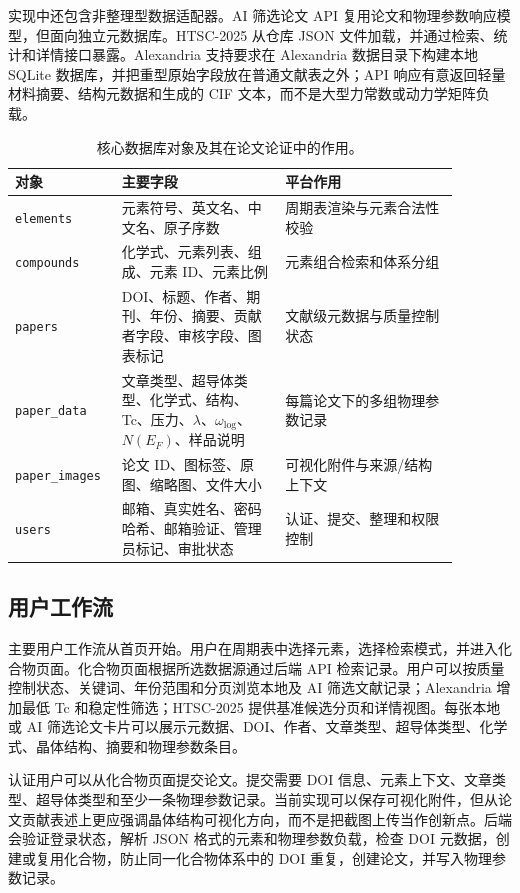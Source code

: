 \documentclass[11pt,a4paper]{ctexart}
\begin{document}
实现中还包含非整理型数据适配器。AI 筛选论文 API 复用论文和物理参数响应模型，但面向独立元数据库。HTSC-2025 从仓库 JSON 文件加载，并通过检索、统计和详情接口暴露。Alexandria 支持要求在 Alexandria 数据目录下构建本地 SQLite 数据库，并把重型原始字段放在普通文献表之外；API 响应有意返回轻量材料摘要、结构元数据和生成的 CIF 文本，而不是大型力常数或动力学矩阵负载。

\begin{table}[t]
\centering
\caption{核心数据库对象及其在论文论证中的作用。}
\label{tab:model-zh}
\begin{tabular}{>{\raggedright\arraybackslash}p{0.18\linewidth} >{\raggedright\arraybackslash}p{0.34\linewidth} >{\raggedright\arraybackslash}p{0.36\linewidth}}
\toprule
对象 & 主要字段 & 平台作用 \\
\midrule
\texttt{elements} & 元素符号、英文名、中文名、原子序数 & 周期表渲染与元素合法性校验 \\
\texttt{compounds} & 化学式、元素列表、组成、元素 ID、元素比例 & 元素组合检索和体系分组 \\
\texttt{papers} & DOI、标题、作者、期刊、年份、摘要、贡献者字段、审核字段、图表标记 & 文献级元数据与质量控制状态 \\
\texttt{paper\_data} & 文章类型、超导体类型、化学式、结构、Tc、压力、$\lambda$、$\omega_{\log}$、$N(E_F)$、样品说明 & 每篇论文下的多组物理参数记录 \\
\texttt{paper\_images} & 论文 ID、图标签、原图、缩略图、文件大小 & 可视化附件与来源/结构上下文 \\
\texttt{users} & 邮箱、真实姓名、密码哈希、邮箱验证、管理员标记、审批状态 & 认证、提交、整理和权限控制 \\
\bottomrule
\end{tabular}
\end{table}

\subsection{用户工作流}

主要用户工作流从首页开始。用户在周期表中选择元素，选择检索模式，并进入化合物页面。化合物页面根据所选数据源通过后端 API 检索记录。用户可以按质量控制状态、关键词、年份范围和分页浏览本地及 AI 筛选文献记录；Alexandria 增加最低 Tc 和稳定性筛选；HTSC-2025 提供基准候选分页和详情视图。每张本地或 AI 筛选论文卡片可以展示元数据、DOI、作者、文章类型、超导体类型、化学式、晶体结构、摘要和物理参数条目。

认证用户可以从化合物页面提交论文。提交需要 DOI 信息、元素上下文、文章类型、超导体类型和至少一条物理参数记录。当前实现可以保存可视化附件，但从论文贡献表述上更应强调晶体结构可视化方向，而不是把截图上传当作创新点。后端会验证登录状态，解析 JSON 格式的元素和物理参数负载，检查 DOI 元数据，创建或复用化合物，防止同一化合物体系中的 DOI 重复，创建论文，并写入物理参数记录。
\end{document}

